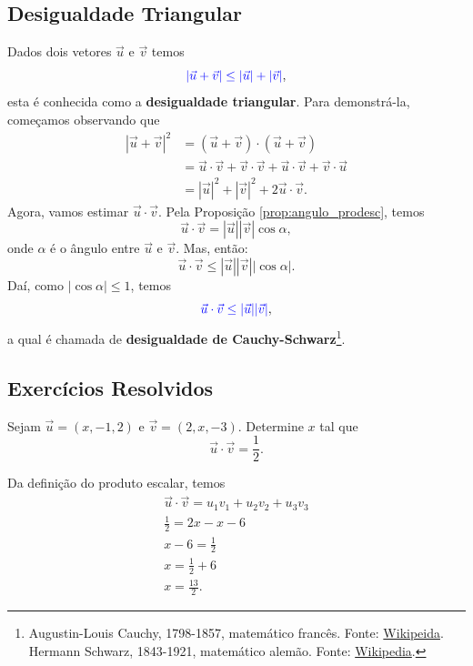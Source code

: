 \subsection{Desigualdade Triangular}

Dados dois vetores $\vec{u}$ e $\vec{v}$ temos
\begin{equation}
  {\color{blue}|\vec{u}+\vec{v}| \leq |\vec{u}| + |\vec{v}|},
\end{equation}
esta é conhecida como a {\bf desigualdade triangular}. Para demonstrá-la, começamos observando que
\begin{align}
  |\vec{u}+\vec{v}|^2 &= (\vec{u}+\vec{v})\cdot(\vec{u}+\vec{v})\\
                      &= \vec{u}\cdot\vec{v}+\vec{v}\cdot\vec{v}+\vec{u}\cdot\vec{v}+\vec{v}\cdot\vec{u}\\
                      &= |\vec{u}|^2 + |\vec{v}|^2 + 2\vec{u}\cdot\vec{v}.  
\end{align}
Agora, vamos estimar $\vec{u}\cdot\vec{v}$. Pela Proposição \ref{prop:angulo_prodesc}, temos
\begin{equation}
  \vec{u}\cdot\vec{v} = |\vec{u}||\vec{v}|\cos\alpha,
\end{equation}
onde $\alpha$ é o ângulo entre $\vec{u}$ e $\vec{v}$. Mas, então:
\begin{equation}
  \vec{u}\cdot\vec{v} \leq |\vec{u}||\vec{v}||\cos\alpha|.
\end{equation}
Daí, como $|\cos\alpha|\leq 1$, temos
\begin{equation}
  {\color{blue}\vec{u}\cdot\vec{v}\leq |\vec{u}||\vec{v}|},
\end{equation}
a qual é chamada de {\bf desigualdade de Cauchy-Schwarz}\footnote{Augustin-Louis Cauchy, 1798-1857, matemático francês. Fonte: \href{https://en.wikipedia.org/wiki/Augustin-Louis_Cauchy}{Wikipeida}. Hermann Schwarz, 1843-1921, matemático alemão. Fonte: \href{https://en.wikipedia.org/wiki/Hermann\_Schwarz}{Wikipedia}.}.

\subsection{Exercícios Resolvidos}

\begin{exeresol}
  Sejam $\vec{u}=(x,-1,2)$ e $\vec{v}=(2,x,-3)$. Determine $x$ tal que
  \begin{equation}
    \vec{u}\cdot\vec{v}=\frac{1}{2}.
  \end{equation}
\end{exeresol}
\begin{resol}
  Da definição do produto escalar, temos
  \begin{gather}
    \vec{u}\cdot\vec{v} = u_1v_1 + u_2v_2 + u_3v_3 \\
    \frac{1}{2} = 2x - x - 6 \\
    x - 6 = \frac{1}{2} \\
    x = \frac{1}{2} + 6 \\
    x = \frac{13}{2}.
  \end{gather}
\end{resol}

